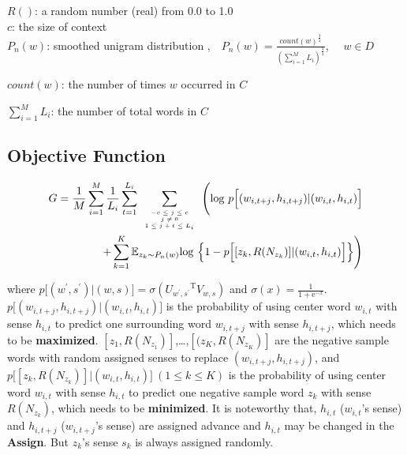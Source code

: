 \documentclass[12pt,a4paper,twoside]{book}
\begin{document}
$R()$: a random number (real) from 0.0 to 1.0\\

$c$: the size of context\\

$P_n(w)$: smoothed unigram distribution ,\ \ $P_n(w) = \frac{count(w)^{\frac{3}{4}}}{(\sum_{i=1}^M L_i)^{\frac{3}{4}}}$, \ \ $w\in D$

$count(w)$: the number of times $w$ occurred in $C$

$\sum_{i=1}^M L_i$: the number of total words in $C$

\subsection{Objective Function}
\begin{equation}
\begin{split}
G = \frac{1}{M}\sum_{i=1}^M\frac{1}{L_i}\sum_{t=1}^{L_i}\sum\limits_{\mbox{\tiny$\begin{array}{c}-c\leq j \leq c\\ j\neq 0\\ 1\leq j+t\leq L_i\end{array}$}}\Bigg (\mathrm{log}\ p\Big [(w_{i,t+j},h_{i,t+j})|(w_{i,t},h_{i,t})\Big ] \\
+\sum\limits_{k=1}^K\mathbb{E}_{z_k\sim P_n(w)}\mathrm{log}\ \Big \{1-p\Big[[z_k,R(N_{z_k})]|(w_{i,t},h_{i,t})\Big ] \Big \} \Bigg )
\end{split}
\end{equation} 

where $p\Big[(w^\prime,s^\prime)|(w,s)\Big] = \sigma({U_{w^\prime,s^\prime}}^{\mathrm{T}}V_{w,s})$
 and $\sigma(x) = \frac{1}{1+\mathrm{e}^{-x}}$. \\
 
 $p\Big [(w_{i,t+j},h_{i,t+j})|(w_{i,t},h_{i,t})\Big ]$ is the probability of using center word $w_{i,t}$ with sense $h_{i,t}$ to predict one surrounding word $w_{i,t+j}$ with sense $h_{i,t+j}$, which needs to be \textbf{maximized}.
$[z_1,R(N_{z_1})]$,\ldots,$[(z_K,R(N_{z_K})]$ are the negative sample words with random assigned senses to replace $(w_{i,t+j},h_{i,t+j})$, and $p\Big[[z_k,R(N_{z_k})]|(w_{i,t},h_{i,t})\Big ]\ (1\leq k\leq K)$ is the probability of using center word $w_{i,t}$ with sense $h_{i,t}$ to predict one negative sample word $z_k$ with sense $R(N_{z_k})$, which needs to be \textbf{minimized}. 
It is noteworthy that, $h_{i,t}$  ($w_{i,t}$'s sense) and $h_{i,t+j}$ ($w_{i,t+j}$'s sense) are assigned advance and $h_{i,t}$ may be changed in the \textbf{Assign}. But $z_k$'s sense $s_k$ is always assigned randomly. \\
\end{document}
